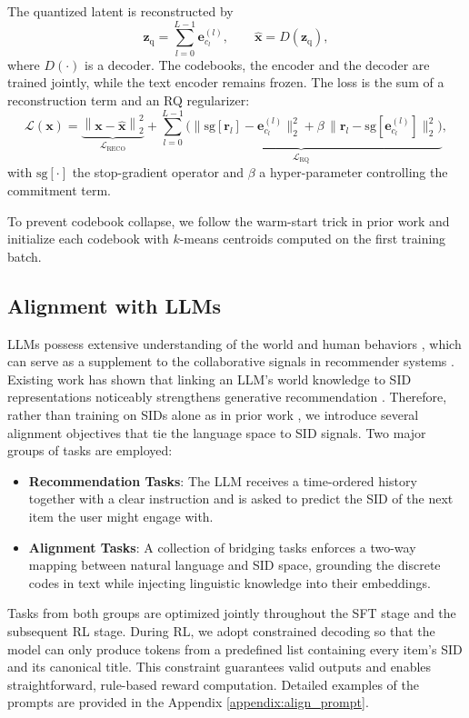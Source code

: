 The quantized latent is reconstructed by
\[
    \mathbf{z}_{\text{q}}=\sum_{l=0}^{L-1}\mathbf{e}^{(l)}_{c_l},
\qquad
    \hat{\mathbf{x}}=D(\mathbf{z}_{\text{q}}),
\]
where $D(\cdot)$ is a decoder. The codebooks, the encoder and the decoder are trained jointly, while the text encoder remains frozen. The loss is the sum of a reconstruction term and an RQ regularizer:
\[
\mathcal{L}(\mathbf{x})=
\underbrace{\left\|\mathbf{x}-\hat{\mathbf{x}}\right\|_2^{2}}_{\mathcal{L}_{\text{RECO}}}
+\underbrace{\sum_{l=0}^{L-1}\!\bigl(
      \|\mathrm{sg}[\mathbf{r}_l]-\mathbf{e}^{(l)}_{c_l}\|_2^{2}
      +\beta\,\|\mathbf{r}_l-\mathrm{sg}[\mathbf{e}^{(l)}_{c_l}]\|_2^{2}\bigr)}_{\mathcal{L}_{\text{RQ}}},
\]
with $\mathrm{sg}[\cdot]$ the stop-gradient operator and $\beta$ a hyper-parameter controlling the commitment term.

To prevent codebook collapse, we follow the warm-start trick in prior work \citep{rqvae, LCRec} and initialize each codebook with $k$-means centroids computed on the first training batch.


\subsection{Alignment with LLMs} \label{sec:alignment_llm}
LLMs possess extensive understanding of the world and human behaviors 
\citep{AlphaRec}, which can serve as a supplement to the collaborative signals in recommender systems \citep{RLMRec}.
Existing work has shown that linking an LLM’s world knowledge to SID representations noticeably strengthens generative recommendation \citep{LlaRA, LCRec}. Therefore, rather than training on SIDs alone as in prior work \citep{TIGER, OneRec, mtgr}, we introduce several alignment objectives that tie the language space to SID signals. Two major groups of tasks are employed:  
\begin{itemize}
    \item \textbf{Recommendation Tasks}: The LLM receives a time-ordered history together with a clear instruction and is asked to predict the SID of the next item the user might engage with.  
    \item \textbf{Alignment Tasks}: A collection of bridging tasks enforces a two-way mapping between natural language and SID space, grounding the discrete codes in text while injecting linguistic knowledge into their embeddings.  
\end{itemize}
Tasks from both groups are optimized jointly throughout the SFT stage and the subsequent RL stage. During RL, we adopt constrained decoding so that the model can only produce tokens from a predefined list containing every item’s SID and its canonical title. This constraint guarantees valid outputs and enables straightforward, rule-based reward computation. Detailed examples of the prompts are provided in the Appendix \ref{appendix:align_prompt}.


